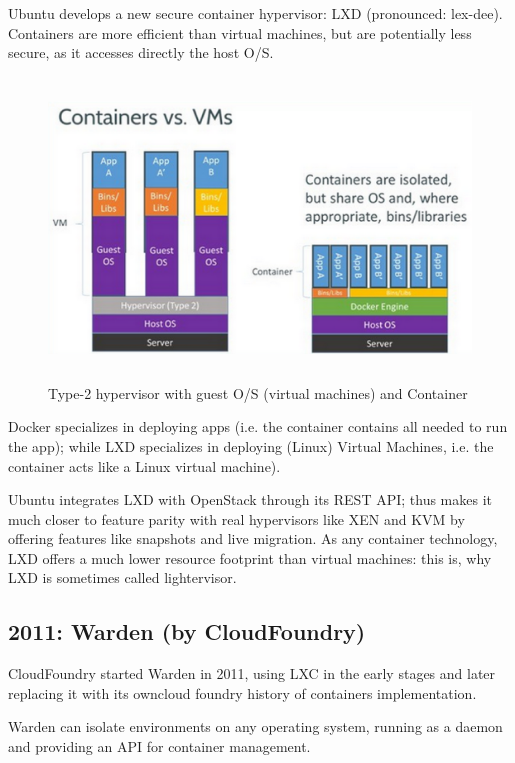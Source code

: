Ubuntu develops a new secure container hypervisor: LXD (pronounced: lex-dee).
Containers are more efficient than virtual machines, but are potentially less
secure, as it accesses directly the host O/S.

\begin{figure}[hbt]
  \centerline{\includegraphics[height=8cm,
    angle=0]{./images/hypervisor_container.eps}}
\caption{Type-2 hypervisor with guest O/S (virtual machines) and Container}
\label{fig:hypervisor_container}
\end{figure}
 
Docker specializes in deploying apps (i.e. the container contains all needed
to run the app); while LXD specializes in deploying (Linux) Virtual Machines,
i.e. the container acts like a Linux virtual machine).

Ubuntu integrates LXD with OpenStack through its REST API; thus makes it much
closer to feature parity with real hypervisors like XEN and KVM by offering
features like snapshots and live migration. As any container technology, LXD
offers a much lower resource footprint than virtual machines:
this is, why LXD is sometimes called lightervisor.



\subsection{2011: Warden (by CloudFoundry)}

CloudFoundry started Warden in 2011, using LXC in the early stages and later
replacing it with its owncloud foundry history of containers implementation.

Warden can isolate environments on any operating system, running as a daemon and
providing an API for container management.

